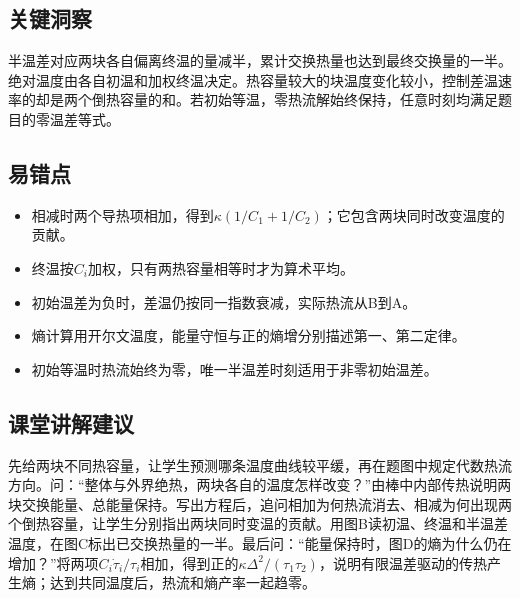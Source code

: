 \documentclass[UTF8,fontset=fandol,a4paper,11pt]{ctexart}
\begin{document}


\subsection*{关键洞察}

半温差对应两块各自偏离终温的量减半，累计交换热量也达到最终交换量的一半。绝对温度由各自初温和加权终温决定。热容量较大的块温度变化较小，控制差温速率的却是两个倒热容量的和。若初始等温，零热流解始终保持，任意时刻均满足题目的零温差等式。



\subsection*{易错点}

\begin{itemize}
\item 相减时两个导热项相加，得到$\kappa(1/C_1+1/C_2)$；它包含两块同时改变温度的贡献。
\item 终温按$C_i$加权，只有两热容量相等时才为算术平均。
\item 初始温差为负时，差温仍按同一指数衰减，实际热流从B到A。
\item 熵计算用开尔文温度，能量守恒与正的熵增分别描述第一、第二定律。
\item 初始等温时热流始终为零，唯一半温差时刻适用于非零初始温差。
\end{itemize}



\subsection*{课堂讲解建议}

先给两块不同热容量，让学生预测哪条温度曲线较平缓，再在题图中规定代数热流方向。问：“整体与外界绝热，两块各自的温度怎样改变？”由棒中内部传热说明两块交换能量、总能量保持。写出方程后，追问相加为何热流消去、相减为何出现两个倒热容量，让学生分别指出两块同时变温的贡献。用图B读初温、终温和半温差温度，在图C标出已交换热量的一半。最后问：“能量保持时，图D的熵为什么仍在增加？”将两项$C_i\dot\tau_i/\tau_i$相加，得到正的$\kappa\Delta^2/(\tau_1\tau_2)$，说明有限温差驱动的传热产生熵；达到共同温度后，热流和熵产率一起趋零。
\end{document}
